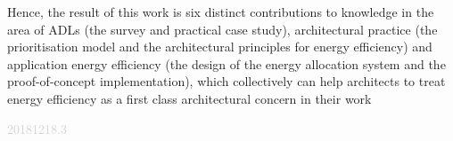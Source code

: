 \documentclass[a4paper, oneside, 11pt, hidelinks]{Thesis}  %
\begin{document}
{Hence, the result of this work is six distinct contributions to knowledge in the area of ADLs (the survey and practical case study), architectural practice (the prioritisation model and the architectural principles for energy efficiency) and application energy efficiency (the design of the energy allocation system and the proof-of-concept implementation), which collectively can help architects to treat energy efficiency as a first class architectural concern in their work

\begin{tiny}
{\setlength{\parindent}{0cm}
	\setlength{\parskip}{0em}
	
	\textcolor{lightgray}{20181218.3}
}
\end{tiny}

\clearpage  %

%
%
%
% 
% 
% 
% 
% 
% 
% 
% 

}
\end{document}
